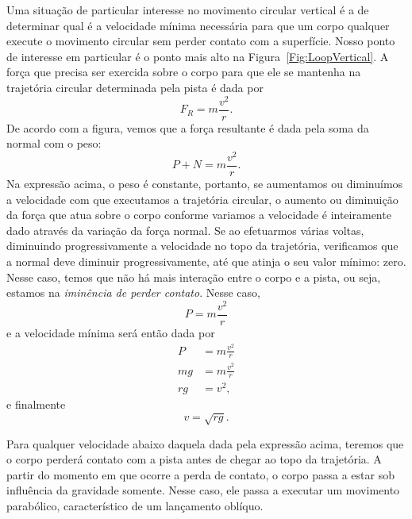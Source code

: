 Uma situação de particular interesse no movimento circular vertical é a de determinar qual é a velocidade mínima necessária para que um corpo qualquer execute o movimento circular sem perder contato com a superfície. Nosso ponto de interesse em particular é o ponto mais alto na Figura~\ref{Fig:LoopVertical}. A força que precisa ser exercida sobre o corpo para que ele se mantenha na trajetória circular determinada pela pista é dada por
\begin{equation}
    F_R = m \frac{v^2}{r}.
\end{equation}
%
De acordo com a figura, vemos que a força resultante é dada pela soma da normal com o peso:
\begin{equation}
    P + N = m\frac{v^2}{r}.
\end{equation}
%
Na expressão acima, o peso é constante, portanto, se aumentamos ou diminuímos a velocidade com que executamos a trajetória circular, o aumento ou diminuição da força que atua sobre o corpo conforme variamos a velocidade é inteiramente dado através da variação da força normal. Se ao efetuarmos várias voltas, diminuindo progressivamente a velocidade no topo da trajetória, verificamos que a normal deve diminuir progressivamente, até que atinja o seu valor mínimo: zero. Nesse caso, temos que não há mais interação entre o corpo e a pista, ou seja, estamos na \emph{iminência de perder contato}. Nesse caso,
\begin{equation}
    P = m \frac{v^2}{r}
\end{equation}
%
e a velocidade mínima será então dada por
\begin{align}
    P &= m\frac{v^2}{r} \\
    mg &= m\frac{v^2}{r} \\
    rg &= v^2,
\end{align}
%
e finalmente
\begin{equation}
    v = \sqrt{rg}.
\end{equation}

Para qualquer velocidade abaixo daquela dada pela expressão acima, teremos que o corpo perderá contato com a pista antes de chegar ao topo da trajetória. A partir do momento em que ocorre a perda de contato, o corpo passa a estar sob influência da gravidade somente. Nesse caso, ele passa a executar um movimento parabólico, característico de um lançamento oblíquo.

